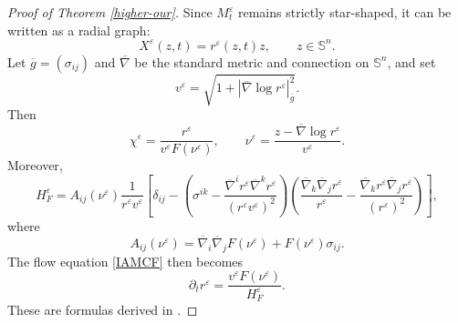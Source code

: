 \documentclass[10pt,a4paper]{amsart}
\numberwithin{equation}{section}
\begin{document}
\begin{proof}[Proof of Theorem \ref{higher-our}]
		 Since $M_t^{\varepsilon}$ remains strictly star-shaped, it can be written as a radial graph:
		\begin{equation*}
			X^{\varepsilon}(z,t)=r^{\varepsilon}(z,t)z, \qquad z\in\mathbb S^n.
		\end{equation*}
		Let $\overline{g}=(\sigma_{ij})$ and $\overline{\nabla}$ be the standard metric and connection on $\mathbb{S}^n$, and set
		\begin{equation*}
			v^{\varepsilon}=\sqrt{1+|\overline{\nabla}\log r^{\varepsilon}|_{\overline{g}}^2}.
		\end{equation*}
		Then
		\begin{equation*}
			\chi^{\varepsilon}=\frac{r^{\varepsilon}}{v^{\varepsilon}F(\nu^{\varepsilon})},\qquad \nu^{\varepsilon}=\dfrac{z-\overline{\nabla}\log r^{\varepsilon}}{v^{\varepsilon}}.
		\end{equation*}
		Moreover,
		\begin{equation}\label{s4.HF}
			H_F^{\varepsilon} = A_{ij}(\nu^{\varepsilon})\dfrac{1}{r^{\varepsilon}v^{\varepsilon}}\left[ \delta_{ij} - \left(\sigma^{ik}-\dfrac{\overline{\nabla}^i r^{\varepsilon}\overline{\nabla}^k r^{\varepsilon}}{(r^{\varepsilon}v^{\varepsilon})^2} \right)\left( \dfrac{\overline{\nabla}_k\overline{\nabla}_j r^{\varepsilon}}{r^{\varepsilon}} - \dfrac{\overline{\nabla}_k r^{\varepsilon} \overline{\nabla}_j r^{\varepsilon}}{(r^{\varepsilon})^2} \right) \right],
		\end{equation}
		where
		\begin{equation*}
			A_{ij}(\nu^{\varepsilon}) = \overline{\nabla}_i\overline{\nabla}_j F(\nu^{\varepsilon})+F(\nu^{\varepsilon})\sigma_{ij}.
		\end{equation*}
		The flow equation \eqref{IAMCF} then becomes
		\begin{equation}
			\label{equ-r}
			\partial_t r^{\varepsilon}=\frac{v^{\varepsilon} F(\nu^{\varepsilon})}{H_F^{\varepsilon}}.
		\end{equation}
		These are formulas derived in \cite[Section 4]{Xia17}.


\end{proof}
\end{document}
